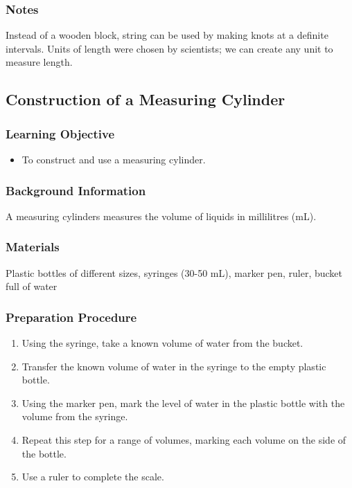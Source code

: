\subsubsection*{Notes}
Instead of a wooden block, string can be used by making knots at a definite intervals. Units of length were chosen by scientists; we can create any unit to measure length.


\subsection{Construction of a Measuring Cylinder}

\subsubsection*{Learning Objective}
\begin{itemize}
\item{To construct and use a measuring cylinder.} 
\end{itemize}

\subsubsection*{Background Information}
A measuring cylinders measures the volume of liquids in millilitres (mL).

\subsubsection*{Materials}
Plastic bottles of different sizes, syringes (30-50 mL), marker pen, ruler, bucket full of water

\subsubsection*{Preparation Procedure}
\begin{enumerate}
\item{Using the syringe, take a known volume of water from the bucket.} 
\item{Transfer the known volume of water in the syringe to the empty plastic bottle.} 
\item{Using the marker pen, mark the level of water in the plastic bottle with the volume from the syringe.}
\item{Repeat this step for a range of volumes, marking each volume on the side of the bottle.}
\item{Use a ruler to complete the scale.} 
\end{enumerate}

